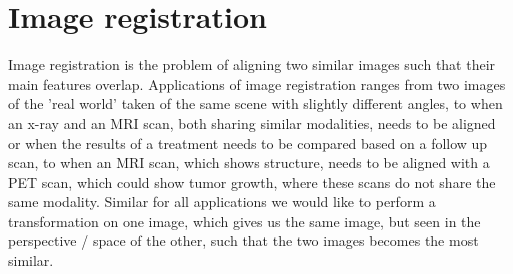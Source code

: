\section{Image registration}
Image registration is the problem of aligning two similar images such that their main features overlap. Applications of image registration ranges from two images of the 'real world' taken of the same scene with slightly different angles, to when an x-ray and an MRI scan, both sharing similar modalities, needs to be aligned or when the results of a treatment needs to be compared based on a follow up scan, to when an MRI scan, which shows structure, needs to be aligned with a PET scan, which could show tumor growth, where these scans do not share the same modality. Similar for all applications we would like to perform a transformation on one image, which gives us the same image, but seen in the perspective / space of the other, such that the two images becomes the most similar.